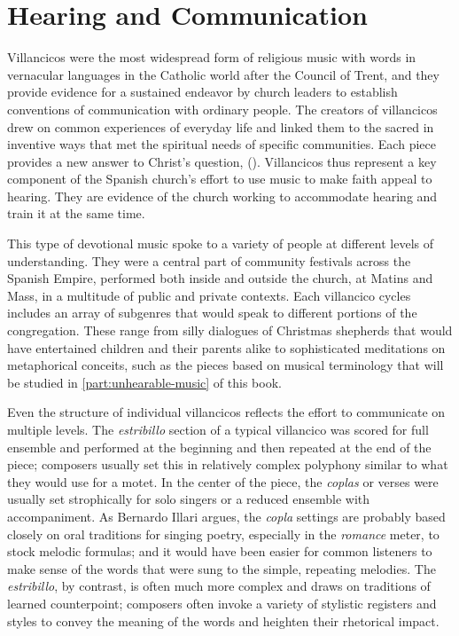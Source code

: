 \section{Hearing and Communication}

Villancicos were the most widespread form of religious music with words in
vernacular languages in the Catholic world after the Council of Trent, and they
provide evidence for a sustained endeavor by church leaders to establish
conventions of communication with ordinary people.
The creators of villancicos drew on common experiences of everyday life and
linked them to the sacred in inventive ways that met the spiritual needs of
specific communities.
Each piece provides a new answer to Christ's question, 
().
Villancicos thus represent a key component of the Spanish church's effort
to use music to make faith appeal to hearing.
They are evidence of the church working to accommodate hearing and train it at
the same time.

This type of devotional music spoke to a variety of people at different levels
of understanding.
They were a central part of community festivals across the Spanish Empire,
performed both inside and outside the church, at Matins and Mass, in a multitude
of public and private contexts.
Each villancico cycles includes an array of subgenres that would speak to
different portions of the congregation.
These range from silly dialogues of Christmas shepherds that would have
entertained children and their parents alike to sophisticated meditations on
metaphorical conceits, such as the pieces based on musical terminology that will
be studied in \cref{part:unhearable-music} of this book.

Even the structure of individual villancicos reflects the effort to communicate
on multiple levels.
The \emph{estribillo} section of a typical villancico was scored for full
ensemble and performed at the beginning and then repeated at the end of the
piece; composers usually set this in relatively complex polyphony similar to
what they would use for a motet.
In the center of the piece, the \emph{coplas} or verses were usually set
strophically for solo singers or a reduced ensemble with accompaniment.
As Bernardo Illari argues, the \emph{copla} settings are probably based closely
on oral traditions for singing poetry, especially in the \emph{romance} meter,
to stock melodic formulas; and it would have been easier for common listeners to
make sense of the words that were sung to the simple, repeating melodies.%
    \Autocite{Illari:Polychoral}
The \emph{estribillo}, by contrast, is often much more complex and draws on
traditions of learned counterpoint; composers often invoke a variety of
stylistic registers and styles to convey the meaning of the words and heighten
their rhetorical impact.

